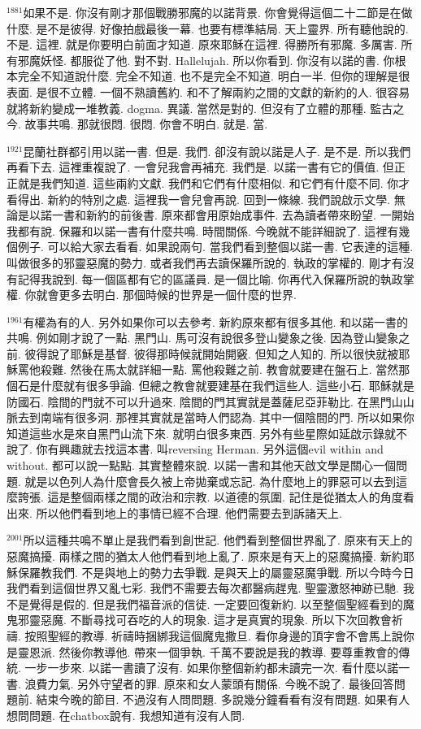 \documentclass{book}
\begin{document}
$^{1881}$如果不是.
你沒有剛才那個戰勝邪魔的以諾背景.
你會覺得這個二十二節是在做什麼.
是不是彼得.
好像拍戲最後一幕.
也要有標準結局.
天上靈界.
所有聽他說的.
不是.
這裡.
就是你要明白前面才知道.
原來耶穌在這裡.
得勝所有邪魔.
多厲害.
所有邪魔妖怪.
都服從了他.
對不對.
Hallelujah.
所以你看到.
你沒有以諾的書.
你根本完全不知道說什麼.
完全不知道.
也不是完全不知道.
明白一半.
但你的理解是很表面.
是很不立體.
一個不熟讀舊約.
和不了解兩約之間的文獻的新約的人.
很容易就將新約變成一堆教義.
dogma.
異議.
當然是對的.
但沒有了立體的那種.
監古之今.
故事共鳴.
那就很悶.
很悶.
你會不明白.
就是.
當.

$^{1921}$昆蘭社群都引用以諾一書.
但是.
我們.
卻沒有說以諾是人子.
是不是.
所以我們再看下去.
這裡重複說了.
一會兒我會再補充.
我們是.
以諾一書有它的價值.
但正正就是我們知道.
這些兩約文獻.
我們和它們有什麼相似.
和它們有什麼不同.
你才看得出.
新約的特別之處.
這裡我一會兒會再說.
回到一條線.
我們說啟示文學.
無論是以諾一書和新約的前後書.
原來都會用原始成事件.
去為讀者帶來盼望.
一開始我都有說.
保羅和以諾一書有什麼共鳴.
時間關係.
今晚就不能詳細說了.
這裡有幾個例子.
可以給大家去看看.
如果說兩句.
當我們看到整個以諾一書.
它表達的這種.
叫做很多的邪靈惡魔的勢力.
或者我們再去讀保羅所說的.
執政的掌權的.
剛才有沒有記得我說到.
每一個區都有它的區議員.
是一個比喻.
你再代入保羅所說的執政掌權.
你就會更多去明白.
那個時候的世界是一個什麼的世界.

$^{1961}$有權為有的人.
另外如果你可以去參考.
新約原來都有很多其他.
和以諾一書的共鳴.
例如剛才說了一點.
黑門山.
馬可沒有說很多登山變象之後.
因為登山變象之前.
彼得說了耶穌是基督.
彼得那時候就開始開竅.
但知之人知的.
所以很快就被耶穌罵他殺難.
然後在馬太就詳細一點.
罵他殺難之前.
教會就要建在盤石上.
當然那個石是什麼就有很多爭論.
但總之教會就要建基在我們這些人.
這些小石.
耶穌就是防國石.
陰間的門就不可以升過來.
陰間的門其實就是蓋薩尼亞菲勒比.
在黑門山山脈去到南端有很多洞.
那裡其實就是當時人們認為.
其中一個陰間的門.
所以如果你知道這些水是來自黑門山流下來.
就明白很多東西.
另外有些星際如延啟示錄就不說了.
你有興趣就去找這本書.
叫reversing Herman.
另外這個evil within and without.
都可以說一點點.
其實整體來說.
以諾一書和其他天啟文學是關心一個問題.
就是以色列人為什麼會長久被上帝拋棄或忘記.
為什麼地上的罪惡可以去到這麼誇張.
這是整個兩樣之間的政治和宗教.
以道德的氛圍.
記住是從猶太人的角度看出來.
所以他們看到地上的事情已經不合理.
他們需要去到訴諸天上.

$^{2001}$所以這種共鳴不單止是我們看到創世記.
他們看到整個世界亂了.
原來有天上的惡魔搞擾.
兩樣之間的猶太人他們看到地上亂了.
原來是有天上的惡魔搞擾.
新約耶穌保羅教我們.
不是與地上的勢力去爭戰.
是與天上的屬靈惡魔爭戰.
所以今時今日我們看到這個世界又亂七彩.
我們不需要去每次都醫病趕鬼.
聖靈激怒神跡已馳.
我不是覺得是假的.
但是我們福音派的信徒.
一定要回復新約.
以至整個聖經看到的魔鬼邪靈惡魔.
不斷尋找可吞吃的人的現象.
這才是真實的現象.
所以下次回教會祈禱.
按照聖經的教導.
祈禱時捆綁我這個魔鬼撒旦.
看你身邊的頂字會不會馬上說你是靈恩派.
然後你教導他.
帶來一個爭執.
千萬不要說是我的教導.
要尊重教會的傳統.
一步一步來.
以諾一書讀了沒有.
如果你整個新約都未讀完一次.
看什麼以諾一書.
浪費力氣.
另外守望者的罪.
原來和女人蒙頭有關係.
今晚不說了.
最後回答問題前.
結束今晚的節目.
不過沒有人問問題.
多說幾分鐘看看有沒有問題.
如果有人想問問題.
在chatbox說有.
我想知道有沒有人問.
\end{document}
